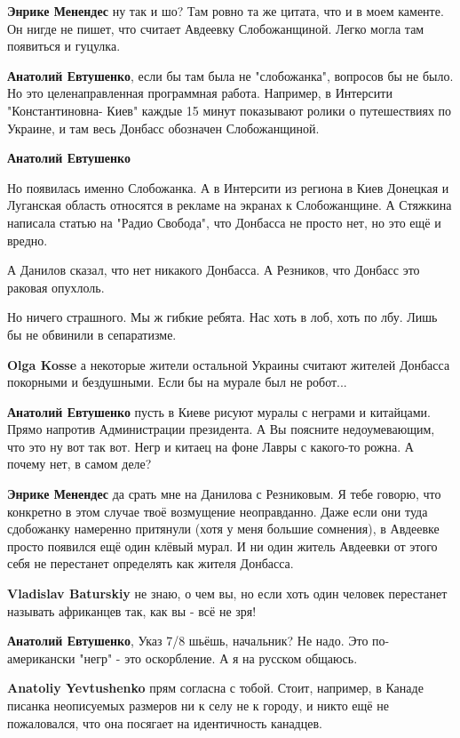 \begin{itemize}
\begin{itemize}
\textbf{Энрике Менендес} ну так и шо? Там ровно та же цитата, что и в моем каменте. Он нигде не пишет, что считает Авдеевку Слобожанщиной. Легко могла там появиться и гуцулка.

\textbf{Анатолий Евтушенко}, если бы там была не "слобожанка", вопросов бы не было. Но это целенаправленная программная работа. Например, в Интерсити "Константиновна- Киев" каждые 15 минут показывают ролики о путешествиях по Украине, и там весь Донбасс обозначен Слобожанщиной.

\textbf{Анатолий Евтушенко} 

Но появилась именно Слобожанка. А в Интерсити из региона в Киев Донецкая и
Луганская область относятся в рекламе на экранах к Слобожанщине. А Стяжкина
написала статью на "Радио Свобода", что Донбасса не просто нет, но это ещё и
вредно.

А Данилов сказал, что нет никакого Донбасса. А Резников, что Донбасс это
раковая опухлоль.

Но ничего страшного. Мы ж гибкие ребята. Нас хоть в лоб, хоть по лбу. Лишь бы
не обвинили в сепаратизме.

\textbf{Olga Kosse} а некоторые жители остальной
Украины считают жителей Донбасса покорными и бездушными. Если бы на мурале был
не робот...

\textbf{Анатолий Евтушенко} пусть в Киеве рисуют муралы с неграми и китайцами. Прямо напротив Администрации президента. А Вы поясните недоумевающим, что это ну вот так вот. Негр и китаец на фоне Лавры с какого-то рожна. А почему нет, в самом деле?

\textbf{Энрике Менендес} да срать мне на Данилова с Резниковым. Я тебе говорю, что конкретно в этом случае твоё возмущение неоправданно. Даже если они туда сдобожанку намеренно притянули (хотя у меня большие сомнения), в Авдеевке просто появился ещё один клёвый мурал. И ни один житель Авдеевки от этого себя не перестанет определять как жителя Донбасса.

\textbf{Vladislav Baturskiy} не знаю, о чем вы, но если хоть один человек перестанет называть африканцев так, как вы - всё не зря!

\textbf{Анатолий Евтушенко}, Указ 7/8 шьёшь, начальник? Не надо. Это по-американски "негр" - это оскорбление. А я на русском общаюсь.

\textbf{Anatoliy Yevtushenko} прям согласна с тобой. Стоит, например, в Канаде писанка неописуемых размеров ни к селу не к городу, и никто ещё не пожаловался, что она посягает на идентичность канадцев.


\end{itemize}
\end{itemize}
